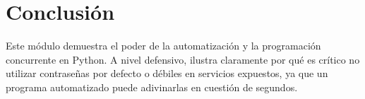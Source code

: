 \documentclass[12pt,a4paper]{article}
\begin{document}
\section*{Conclusión}
Este módulo demuestra el poder de la automatización y la programación concurrente en Python. A nivel defensivo, ilustra claramente por qué es crítico no utilizar contraseñas por defecto o débiles en servicios expuestos, ya que un programa automatizado puede adivinarlas en cuestión de segundos.
\end{document}
